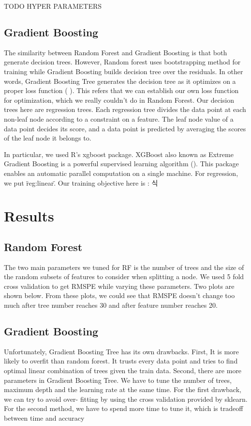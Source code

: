 \documentclass[letterpaper,twocolumn,10pt]{article}
\begin{document}
TODO HYPER PARAMETERS


\subsection{Gradient Boosting}
The similarity between Random Forest and Gradient Boosting is that both generate decision trees. However, Random forest uses bootstrapping method for training while Gradient Boosting builds decision tree over the residuals. In other words, Gradient Boosting Tree generates the decision tree as it optimizes on a proper loss function (   ). This refers that we can establish our own loss function for optimization, which we really couldn't do in Random Forest. Our decision trees here are regression trees. Each regression tree divides the data point at each non-leaf node according to a constraint on a feature. The leaf node value of a data point decides its score, and a data point is predicted by averaging the scores of the leaf node it belongs to.

In particular, we used R's xgboost package. XGBoost also known as Extreme Gradient Boosting is a powerful supervised learning algorithm (). This package enables an automatic parallel computation on a single machine. For regression, we put \"reg:linear\". Our training objective here is : 식 





\section{Results}

\subsection{Random Forest}
The two main  parameters  we  tuned for RF  is  the number  of  trees and the size  of  the random  subsets of  features  to  
consider  when  splitting a node. We  used  5 fold cross validation  to  get RMSPE while varying these parameters. Two plots 
are shown below.  From  these plots,  we  could see that  RMSPE doesn’t change  too much  after tree  number  reaches 30  and 
after feature number  reaches 20.




\subsection{Gradient Boosting}
Unfortunately, Gradient Boosting Tree has its own drawbacks.
First, It is more likely to overfit than random forest.
It trusts every data point and tries to find optimal linear combination
of trees given the train data. Second, there are more
parameters in Gradient Boosting Tree. We have to tune the
number of trees, maximum depth and the learning rate at the
same time. For the first drawback, we can try to avoid over-
fitting by using the cross validation provided by sklearn. For
the second method, we have to spend more time to tune it,
which is tradeoff between time and accuracy
\end{document}
